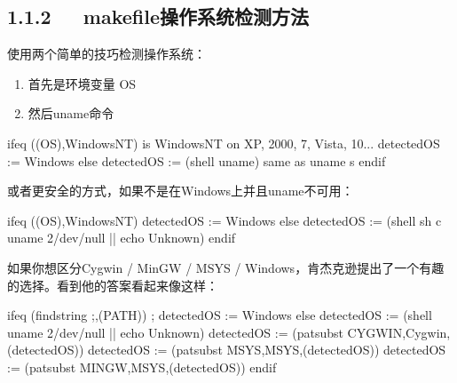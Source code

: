 \documentclass[letterpaper,12pt,english]{sphinxmanual}
\begin{document}
\subsection{1.1.2   makefile操作系统检测方法}
\label{\detokenize{004.study/001._u7f16_u7a0b/001.make/makefile:id3}}
使用两个简单的技巧检测操作系统：
\begin{enumerate}
%
\item {} 
首先是环境变量 OS

\item {} 
然后uname命令

\end{enumerate}

\begin{sphinxVerbatim}[commandchars=\\\{\}]
ifeq (\PYGZdl{}(OS),Windows\PYGZus{}NT)     \PYGZsh{} is Windows\PYGZus{}NT on XP, 2000, 7, Vista, 10...
    detected\PYGZus{}OS := Windows
else
    detected\PYGZus{}OS := \PYGZdl{}(shell uname)  \PYGZsh{} same as \PYGZdq{}uname \PYGZhy{}s\PYGZdq{}
endif
\end{sphinxVerbatim}

或者更安全的方式，如果不是在Windows上并且uname不可用：

\begin{sphinxVerbatim}[commandchars=\\\{\}]
ifeq (\PYGZdl{}(OS),Windows\PYGZus{}NT)
    detected\PYGZus{}OS := Windows
else
    detected\PYGZus{}OS := \PYGZdl{}(shell sh \PYGZhy{}c \PYGZsq{}uname 2\PYGZgt{}/dev/null || echo Unknown\PYGZsq{})
endif
\end{sphinxVerbatim}

如果你想区分Cygwin / MinGW / MSYS / Windows，肯杰克逊提出了一个有趣的选择。看到他的答案看起来像这样：

\begin{sphinxVerbatim}[commandchars=\\\{\}]
ifeq \PYGZsq{}\PYGZdl{}(findstring ;,\PYGZdl{}(PATH))\PYGZsq{} \PYGZsq{};\PYGZsq{}
    detected\PYGZus{}OS := Windows
else
    detected\PYGZus{}OS := \PYGZdl{}(shell uname 2\PYGZgt{}/dev/null || echo Unknown)
    detected\PYGZus{}OS := \PYGZdl{}(patsubst CYGWIN\PYGZpc{},Cygwin,\PYGZdl{}(detected\PYGZus{}OS))
    detected\PYGZus{}OS := \PYGZdl{}(patsubst MSYS\PYGZpc{},MSYS,\PYGZdl{}(detected\PYGZus{}OS))
    detected\PYGZus{}OS := \PYGZdl{}(patsubst MINGW\PYGZpc{},MSYS,\PYGZdl{}(detected\PYGZus{}OS))
endif
\end{sphinxVerbatim}
\end{document}
